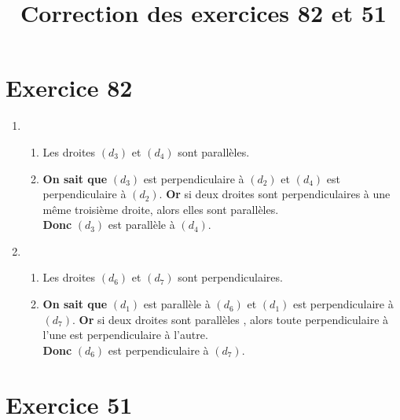\documentclass[12pt,a4paper]{article}
\title{Correction des exercices 82 et 51}
\date{}
\begin{document}
	
	\maketitle
	
	\section*{Exercice 82}
	\begin{enumerate}[label=\arabic*)]
		\item \begin{enumerate}[label=\alph*)]
			\item Les droites $(d_3)$ et $(d_4)$ sont parallèles.
			
			\item 
			\textbf{On sait que} $(d_3)$ est perpendiculaire à $(d_2)$ et $(d_4)$ est perpendiculaire à $(d_2)$. %
			\textbf{Or} si deux droites sont perpendiculaires à une même troisième droite, alors elles sont parallèles.\\
			\textbf{Donc} $(d_3)$ est parallèle à $(d_4)$. %
		\end{enumerate}
	
	
		\item \begin{enumerate}[label=\alph*)]
			\item Les droites $(d_6)$ et $(d_7)$ sont perpendiculaires.
			
			\item 
			\textbf{On sait que} $(d_1)$ est parallèle à $(d_6)$ et $(d_1)$ est perpendiculaire à $(d_7)$. %
			\textbf{Or} si deux droites sont parallèles , alors toute perpendiculaire à l'une est perpendiculaire à l'autre.\\
			\textbf{Donc} $(d_6)$ est perpendiculaire à $(d_7)$. %
		\end{enumerate}
	\end{enumerate}

	\section*{Exercice 51}
	
\end{document}
